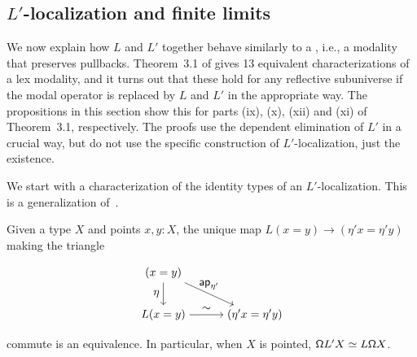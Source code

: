 \subsection{$L'$-localization and finite limits}\label{ss:lex}

We now explain how $L$ and $L'$ together behave similarly to a ,
i.e., a modality that preserves pullbacks.
Theorem~3.1 of \cite{RijkeShulmanSpitters} gives 13 equivalent characterizations of a lex modality,
and it turns out that these hold for any reflective subuniverse
if the modal operator is replaced by $L$ and $L'$ in the appropriate way.
The propositions in this section show this for parts (ix), (x), (xii) and (xi)
of Theorem~3.1, respectively.
The proofs use the dependent elimination of $L'$ in a crucial way,
but do not use the specific construction of $L'$-localization, just the existence.

We start with a characterization of the identity types of an $L'$-localization.
This is a generalization of~\cite[Lemma~7.3.12]{hottbook}.

\begin{prop}\label{Lseparatedloopspace} %
    Given a type $X$ and points $x,y : X$, the unique map $L(x = y) \to (\eta' x = \eta' y)$ making the triangle
    \[
    \begin{tikzpicture}
      \matrix (m) [matrix of math nodes,row sep=2em,column sep=3em,minimum width=2em]
      { (x=y) & \\
        L(x = y)& (\eta' x = \eta' y) \\};
      \path[->]
        (m-1-1) edge node [left] {$\eta$} (m-2-1)
                edge node [above] {$\mathsf{ap}_{\eta'}$} (m-2-2)
        (m-2-1) edge node [above] {$\sim$} (m-2-2)
        ;
    \end{tikzpicture}
    \]
    commute is an equivalence.
In particular, when $X$ is pointed,
$\mathsf{\Omega} L' X \simeq L \mathsf{\Omega} X$.
\end{prop}

